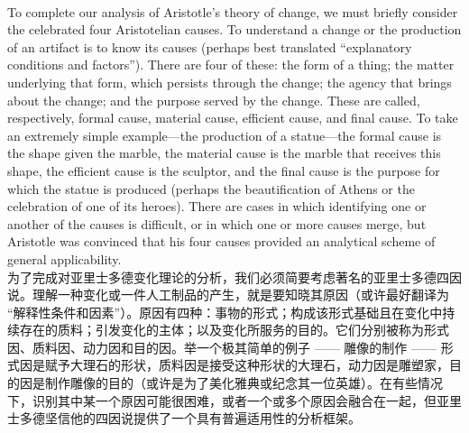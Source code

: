 \documentclass{article}
\begin{document}
\\
To complete our analysis of Aristotle’s theory of change, we must briefly consider the celebrated four Aristotelian causes. To understand a change or the production of an artifact is to know its causes (perhaps best translated “explanatory conditions and factors”). There are four of these: the form of a thing; the matter underlying that form, which persists through the change; the agency that brings about the change; and the purpose served by the change. These are called, respectively, formal cause, material cause, efficient cause, and final cause. To take an extremely simple example—the production of a statue—the formal cause is the shape given the marble, the material cause is the marble that receives this shape, the efficient cause is the sculptor, and the final cause is the purpose for which the statue is produced (perhaps the beautification of Athens or the celebration of one of its heroes). There are cases in which identifying one or another of the causes is difficult, or in which one or more causes merge, but Aristotle was convinced that his four causes provided an analytical scheme of general applicability.\\
为了完成对亚里士多德变化理论的分析，我们必须简要考虑著名的亚里士多德四因说。理解一种变化或一件人工制品的产生，就是要知晓其原因（或许最好翻译为 “解释性条件和因素”）。原因有四种：事物的形式；构成该形式基础且在变化中持续存在的质料；引发变化的主体；以及变化所服务的目的。它们分别被称为形式因、质料因、动力因和目的因。举一个极其简单的例子 —— 雕像的制作 —— 形式因是赋予大理石的形状，质料因是接受这种形状的大理石，动力因是雕塑家，目的因是制作雕像的目的（或许是为了美化雅典或纪念其一位英雄）。在有些情况下，识别其中某一个原因可能很困难，或者一个或多个原因会融合在一起，但亚里士多德坚信他的四因说提供了一个具有普遍适用性的分析框架。\\
\end{document}
